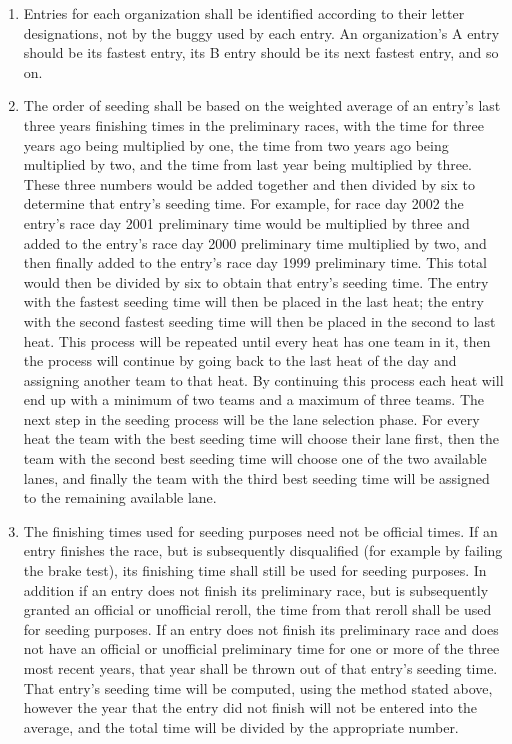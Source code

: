 	\begin{enumerate}
	
		\item Entries for each organization shall be identified according to
		their letter designations, not by the buggy used by each entry. An
		organization's A entry should be its fastest entry, its B entry should be its
		next fastest entry, and so on.

		\item The order of seeding shall be based on the weighted average of an
		entry's last three years finishing times in the preliminary races, with the
		time for three years ago being multiplied by one, the time from two years ago
		being multiplied by two, and the time from last year being multiplied by three.
		These three numbers would be added together and then divided by six to
		determine that entry's seeding time. For example, for race day 2002 the entry's
		race day 2001 preliminary time would be multiplied by three and added to the
		entry's race day 2000 preliminary time multiplied by two, and then finally
		added to the entry's race day 1999 preliminary time. This total would then be
		divided by six to obtain that entry's seeding time. The entry with the fastest
		seeding time will then be placed in the last heat; the entry with the second
		fastest seeding time will then be placed in the second to last heat. This
		process will be repeated until every heat has one team in it, then the process
		will continue by going back to the last heat of the day and assigning another
		team to that heat. By continuing this process each heat will end up with a
		minimum of two teams and a maximum of three teams. The next step in the seeding
		process will be the lane selection phase. For every heat the team with the best
		seeding time will choose their lane first, then the team with the second best
		seeding time will choose one of the two available lanes, and finally the team
		with the third best seeding time will be assigned to the remaining available
		lane.

		\item The finishing times used for seeding purposes need not be
		official times. If an entry finishes the race, but is subsequently disqualified
		(for example by failing the brake test), its finishing time shall still be used
		for seeding purposes. In addition if an entry does not finish its preliminary
		race, but is subsequently granted an official or unofficial reroll, the time
		from that reroll shall be used for seeding purposes. If an entry does not
		finish its preliminary race and does not have an official or unofficial
		preliminary time for one or more of the three most recent years, that year
		shall be thrown out of that entry's seeding time. That entry's seeding time
		will be computed, using the method stated above, however the year that the
		entry did not finish will not be entered into the average, and the total time
		will be divided by the appropriate number.


\end{enumerate}
